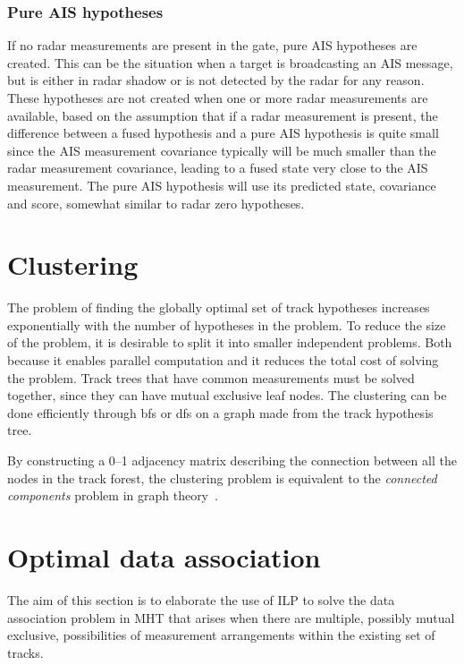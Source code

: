 \subsubsection{Pure AIS hypotheses}\label{subsec:pure_ais_hypotheses}
If no radar measurements are present in the gate, pure AIS hypotheses are created. This can be the situation when a target is broadcasting an AIS message, but is either in radar shadow or is not detected by the radar for any reason. These hypotheses are not created when one or more radar measurements are available, based on the assumption that if a radar measurement is present, the difference between a fused hypothesis and a pure AIS hypothesis is quite small since the AIS measurement covariance typically will be much smaller than the radar measurement covariance, leading to a fused state very close to the AIS measurement. The pure AIS hypothesis will use its predicted state, covariance and score, somewhat similar to radar zero hypotheses.

\section{Clustering}
The problem of finding the globally optimal set of track hypotheses increases exponentially with the number of hypotheses in the problem. To reduce the size of the problem, it is desirable to split it into smaller independent problems. Both because it enables parallel computation and it reduces the total cost of solving the problem. Track trees that have common measurements must be solved together, since they can have mutual exclusive leaf nodes. The clustering can be done efficiently through \gls{bfs} or \gls{dfs} on a graph made from the \gls{track hypothesis tree}.

By constructing a 0--1 adjacency matrix describing the connection between all the nodes in the \gls{track forest}, the clustering problem is equivalent to the \emph{connected components} problem in graph theory~\cite{Chen2015}.

\section{Optimal data association}\label{sec:optim_data_association}
The aim of this section is to elaborate the use of ILP to solve the data association problem in MHT that arises when there are multiple, possibly mutual exclusive, possibilities of measurement arrangements within the existing set of tracks.

